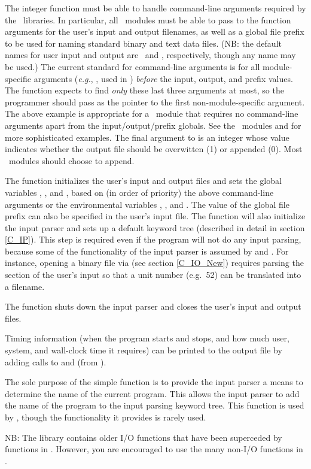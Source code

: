 The integer function  must be able to handle
command-line arguments required by the \PSIthree\ libraries.  In
particular, all \PSIthree\ modules must be able to pass to the
function  arguments for the user's input and
output filenames, as well as a global file prefix to be used for
naming standard binary and text data files.  (NB: the default names
for user input and output are \ and \outputdat, respectively,
though any name may be used.) The current standard for command-line
arguments is for all module-specific arguments ({\em e.g.},
, used in ) {\em before} the input,
output, and prefix values.  The  function expects
to find {\em only} these last three arguments at most, so the
programmer should pass as  the pointer to the first
non-module-specific argument.  The above example is appropriate for a
\PSIthree\ module that requires no command-line arguments apart from
the input/output/prefix globals.  See the \PSIthree\ modules
 and  for more sophisticated examples.
The final argument to  is an integer whose value
indicates whether the output file should be overwitten (1) or appended
(0).  Most \PSIthree\ modules should choose to append.

The  function initializes the user's input and
output files and sets the global variables ,
, and , based on (in order of
priority) the above command-line arguments or the environmental
variables , , and
.  The value of the global file prefix can also be
specified in the user's input file.  The  function
will also initialize the input parser and sets up a default keyword
tree (described in detail in section \ref{C_IP}).  This step is
required even if the program will not do any input parsing, because
some of the functionality of the input parser is assumed by
 and .  For instance, opening a
binary file via  (see section \ref{C_IO_New})
requires parsing the  section of the user's input so
that a unit number (e.g.~52) can be translated into a filename.

The  function shuts down the input parser and closes
the user's input and output files.

Timing information (when the program starts and stops, and how much
user, system, and wall-clock time it requires) can be printed to the
output file by adding calls to  and 
(from ).

The sole purpose of the simple function  is to provide
the input parser a means to determine the name of the current program.
This allows the input parser to add the name of the program to the
input parsing keyword tree.  This function is used by
, though the functionality it provides is rarely
used.

NB: The library  contains older I/O functions that
have been superceded by functions in .  However,
you are encouraged to use the many non-I/O functions in
.
